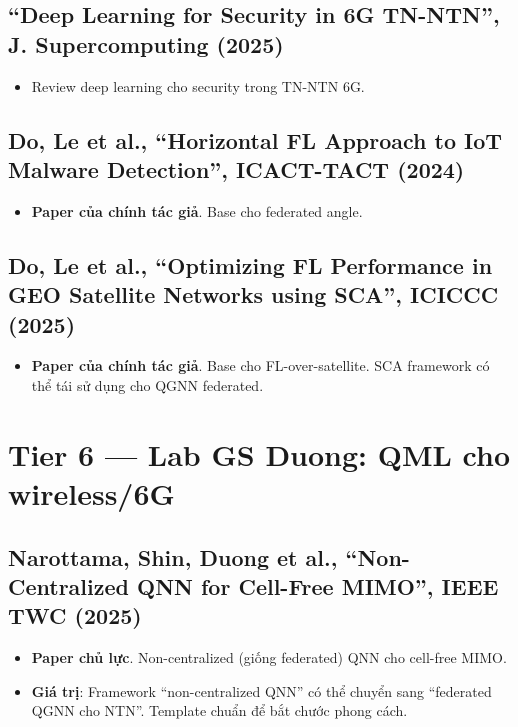 \documentclass[11pt,a4paper]{article}
\begin{document}
\subsection{``Deep Learning for Security in 6G TN-NTN'', J. Supercomputing (2025)}
\begin{itemize}
  \item Review deep learning cho security trong TN-NTN 6G.
\end{itemize}

\subsection{Do, Le et al., ``Horizontal FL Approach to IoT Malware Detection'', ICACT-TACT (2024)}
\begin{itemize}
  \item \textbf{Paper của chính tác giả}. Base cho federated angle.
\end{itemize}

\subsection{Do, Le et al., ``Optimizing FL Performance in GEO Satellite Networks using SCA'', ICICCC (2025)}
\begin{itemize}
  \item \textbf{Paper của chính tác giả}. Base cho FL-over-satellite. SCA framework có thể tái sử dụng cho QGNN federated.
\end{itemize}

\section{Tier 6 --- Lab GS Duong: QML cho wireless/6G}

\subsection{Narottama, Shin, \textbf{Duong} et al., ``Non-Centralized QNN for Cell-Free MIMO'', IEEE TWC (2025)}
\begin{itemize}
  \item \textbf{Paper chủ lực}. Non-centralized (giống federated) QNN cho cell-free MIMO.
  \item \textbf{Giá trị}: Framework ``non-centralized QNN'' có thể chuyển sang ``federated QGNN cho NTN''. Template chuẩn để bắt chước phong cách.
\end{itemize}
\end{document}
